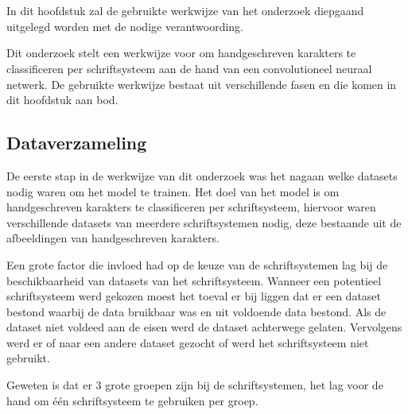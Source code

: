 
\chapter{}
\label{ch:methodologie}


In dit hoofdstuk zal de gebruikte werkwijze van het onderzoek diepgaand uitgelegd worden met de nodige verantwoording.

Dit onderzoek stelt een werkwijze voor om handgeschreven karakters te classificeren per schriftsysteem aan de hand van een convolutioneel neuraal netwerk.
De gebruikte werkwijze bestaat uit verschillende fasen en die komen in dit hoofdstuk aan bod.


\section{Dataverzameling}

De eerste stap in de werkwijze van dit onderzoek was het nagaan welke datasets nodig waren om het model te trainen.
Het doel van het model is om handgeschreven karakters te classificeren per schriftsysteem, hiervoor waren verschillende datasets van meerdere schriftsystemen nodig, deze bestaande uit de afbeeldingen van handgeschreven karakters.

Een grote factor die invloed had op de keuze van de schriftsystemen lag bij de beschikbaarheid van datasets van het schriftsysteem.
Wanneer een potentieel schriftsysteem werd gekozen moest het toeval er bij liggen dat er een dataset bestond waarbij de data bruikbaar was en uit voldoende data bestond.
Als de dataset niet voldeed aan de eisen werd de dataset achterwege gelaten.
Vervolgens werd er of naar een andere dataset gezocht of werd het schriftsysteem niet gebruikt.



Geweten is dat er 3 grote groepen zijn bij de schriftsystemen, het lag voor de hand om één schriftsysteem te gebruiken per groep.

